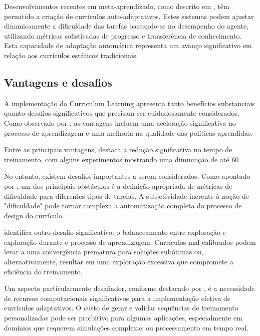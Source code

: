 Desenvolvimentos recentes em meta-aprendizado, como descrito em \cite{https://arxiv.org/abs/2310.19424}, têm permitido a criação de currículos auto-adaptativos. Estes sistemas podem ajustar dinamicamente a dificuldade das tarefas baseando-se no desempenho do agente, utilizando métricas sofisticadas de progresso e transferência de conhecimento. Esta capacidade de adaptação automática representa um avanço significativo em relação aos currículos estáticos tradicionais.

\subsection{Vantagens e desafios}
\label{subsec:curriculum_vantagens_desafios}

A implementação do Curriculum Learning apresenta tanto benefícios substanciais quanto desafios significativos que precisam ser cuidadosamente considerados. Como observado por \cite{https://zilliz.com/ai-faq/what-is-curriculum-learning-in-reinforcement-learning}, as vantagens incluem uma aceleração significativa no processo de aprendizagem e uma melhoria na qualidade das políticas aprendidas.

Entre as principais vantagens, \cite{https://repositories.lib.utexas.edu/items/d6530e2e-35e5-452e-972c-8b3bb1dea93b} destaca a redução significativa no tempo de treinamento, com alguns experimentos mostrando uma diminuição de até 60%

No entanto, existem desafios importantes a serem considerados. Como apontado por \cite{https://openreview.net/forum?id=anbBFlX1tJ1}, um dos principais obstáculos é a definição apropriada de métricas de dificuldade para diferentes tipos de tarefas. A subjetividade inerente à noção de "dificuldade" pode tornar complexa a automatização completa do processo de design do currículo.

\cite{https://jmlr.org/papers/volume21/20-212/20-212.pdf} identifica outro desafio significativo: o balanceamento entre exploração e exploração durante o processo de aprendizagem. Currículos mal calibrados podem levar a uma convergência prematura para soluções subótimas ou, alternativamente, resultar em uma exploração excessiva que compromete a eficiência do treinamento.

Um aspecto particularmente desafiador, conforme destacado por \cite{https://dl.acm.org/doi/10.1145/3503161.3548549}, é a necessidade de recursos computacionais significativos para a implementação efetiva de currículos adaptativos. O custo de gerar e validar sequências de treinamento personalizadas pode ser proibitivo para algumas aplicações, especialmente em domínios que requerem simulações complexas ou processamento em tempo real.

